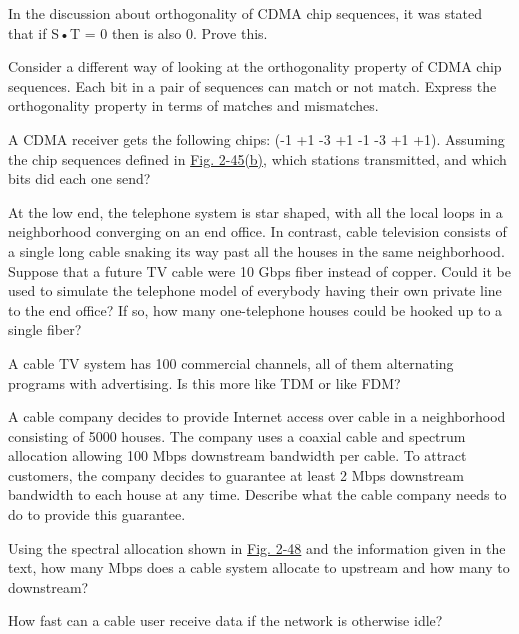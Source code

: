 \documentclass[b5paper,11pt]{memoir}
\begin{document}
{}

In the discussion about orthogonality of CDMA chip sequences, it was
stated that if {S}•{T} = 0 then
 is also
0. Prove this.

{}

Consider a different way of looking at the orthogonality property of
CDMA chip sequences. Each bit in a pair of sequences can match or not
match. Express the orthogonality property in terms of matches and
mismatches.

{}

A CDMA receiver gets the following chips: (-1 +1 -3 +1 -1 -3 +1 +1).
Assuming the chip sequences defined in
\protect\hyperlink{0130661023_ch02lev1sec6.htmlux5cux23ch02fig45}{Fig.
2-45(b)}, which stations transmitted, and which bits did each one send?

{}

At the low end, the telephone system is star shaped, with all the local
loops in a neighborhood converging on an end office. In contrast, cable
television consists of a single long cable snaking its way past all the
houses in the same neighborhood. Suppose that a future TV cable were 10
Gbps fiber instead of copper. Could it be used to simulate the telephone
model of everybody having their own private line to the end office? If
so, how many one-telephone houses could be hooked up to a single fiber?

{}

A cable TV system has 100 commercial channels, all of them alternating
programs with advertising. Is this more like TDM or like FDM?

{}

A cable company decides to provide Internet access over cable in a
neighborhood consisting of 5000 houses. The company uses a coaxial cable
and spectrum allocation allowing 100 Mbps downstream bandwidth per
cable. To attract customers, the company decides to guarantee at least 2
Mbps downstream bandwidth to each house at any time. Describe what the
cable company needs to do to provide this guarantee.

{}

Using the spectral allocation shown in
\protect\hyperlink{0130661023_ch02lev1sec7.htmlux5cux23ch02fig48}{Fig.
2-48} and the information given in the text, how many Mbps does a cable
system allocate to upstream and how many to downstream?

{}

How fast can a cable user receive data if the network is otherwise idle?
\end{document}
